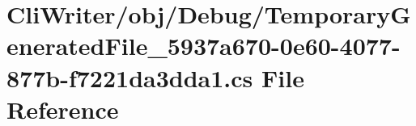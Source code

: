 \hypertarget{_temporary_generated_file__5937a670-0e60-4077-877b-f7221da3dda1_8cs}{}\section{Cli\+Writer/obj/\+Debug/\+Temporary\+Generated\+File\+\_\+5937a670-\/0e60-\/4077-\/877b-\/f7221da3dda1.cs File Reference}
\label{_temporary_generated_file__5937a670-0e60-4077-877b-f7221da3dda1_8cs}
